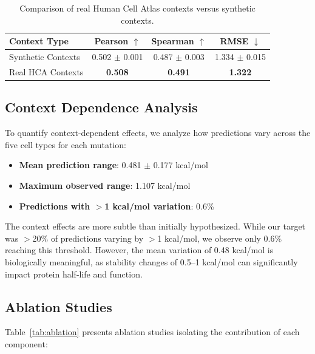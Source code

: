 \documentclass{article}
\begin{document}
\begin{table}[t]
\caption{Comparison of real Human Cell Atlas contexts versus synthetic contexts.}
\label{tab:real_vs_synthetic}
\centering
\begin{tabular}{lccc}
\toprule
Context Type & Pearson $\uparrow$ & Spearman $\uparrow$ & RMSE $\downarrow$ \\
\midrule
Synthetic Contexts & 0.502 $\pm$ 0.001 & 0.487 $\pm$ 0.003 & 1.334 $\pm$ 0.015 \\
Real HCA Contexts & \textbf{0.508} & \textbf{0.491} & \textbf{1.322} \\
\bottomrule
\end{tabular}
\end{table}

\subsection{Context Dependence Analysis}

To quantify context-dependent effects, we analyze how predictions vary across the five cell types for each mutation:
\begin{itemize}
    \item \textbf{Mean prediction range}: 0.481 $\pm$ 0.177 kcal/mol
    \item \textbf{Maximum observed range}: 1.107 kcal/mol
    \item \textbf{Predictions with $>$1 kcal/mol variation}: 0.6\%
\end{itemize}

The context effects are more subtle than initially hypothesized. While our target was $>$20\% of predictions varying by $>$1 kcal/mol, we observe only 0.6\% reaching this threshold. However, the mean variation of 0.48 kcal/mol is biologically meaningful, as stability changes of 0.5--1 kcal/mol can significantly impact protein half-life and function.

\subsection{Ablation Studies}

Table~\ref{tab:ablation} presents ablation studies isolating the contribution of each component:
\end{document}
